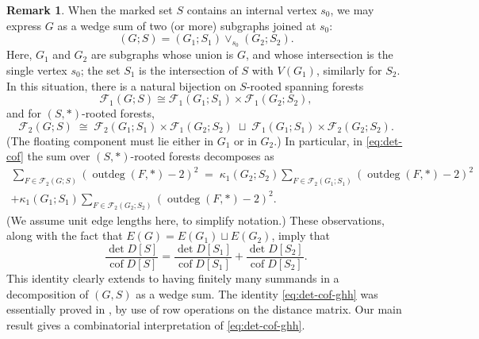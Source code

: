 \documentclass[12pt]{amsart}
\theoremstyle{definition}
\newtheorem{rmk}[thm]{Remark}
\DeclareMathOperator{\cof}{cof}
\newcommand{\forests}{\mathcal{F}}
\DeclareMathOperator{\outdeg}{outdeg}
\begin{document}
\begin{rmk}
	When the marked set $S$ contains an internal vertex $s_0$, we may express $G$ as a wedge sum of two (or more) subgraphs joined at $s_0$:
	\[
		(G; S) = (G_1; S_1) \vee_{s_0} (G_2; S_2).
	\]
	Here, $G_1$ and $G_2$ are subgraphs whose union is $G$, and whose intersection is the single vertex $s_0$;
	the set $S_1$ is the intersection of $S$ with $V(G_1)$, similarly for $S_2$.
	In this situation, there is a natural bijection on $S$-rooted spanning forests
	\[
	\forests_1(G; S) \cong \forests_1(G_1; S_1) \times \forests_1(G_2; S_2),
	\]
	and for $(S, *)$-rooted forests,
	\[
	\forests_2(G; S) \;\cong\; \forests_2(G_1; S_1) \times \forests_1(G_2; S_2) \;\sqcup\; \forests_1(G_1; S_1) \times \forests_2(G_2; S_2) .
	\]
	(The floating component must lie either in $G_1$ or in $G_2$.)
	In particular, in \eqref{eq:det-cof} the sum over $(S, *)$-rooted forests decomposes as 
	\begin{multline*}
	\sum_{F \in \forests_2(G; S)} (\outdeg(F, *) - 2)^2 \;=\; \kappa_1(G_2; S_2) \sum_{F \in \forests_2(G_1; S_1)} (\outdeg(F, *) - 2)^2 \\
	+ \kappa_1(G_1; S_1) \sum_{F \in \forests_2(G_2; S_2)} (\outdeg(F, *) - 2)^2 .
	\end{multline*}
	(We assume unit edge lengths here, to simplify notation.)
	These observations, along with the fact that $E(G) = E(G_1) \sqcup E(G_2)$, imply that
	\begin{equation}\label{eq:det-cof-ghh}
	\frac{\det D[S]}{\cof D[S]} = \frac{\det D[S_1]}{\cof D[S_1]} + \frac{\det D[S_2]}{\cof D[S_2]} .
	\end{equation}
	This identity clearly extends to having finitely many summands in a decomposition of $(G, S)$ as a wedge sum.
	The identity \eqref{eq:det-cof-ghh} was essentially proved in \cite{graham-hoffman-hosoya}, by use of row operations on the distance matrix.
	Our main result gives a combinatorial interpretation of \eqref{eq:det-cof-ghh}.
\end{rmk}

	

	
\end{document}
